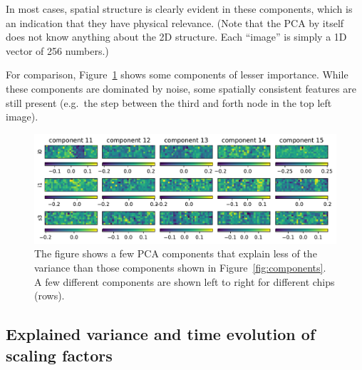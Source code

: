 \documentclass[]{spie}  %
\begin{document}
In most cases, spatial structure is clearly evident in these components, which is an indication that they have physical relevance. (Note that the PCA by itself does not know anything about the 2D structure. Each ``image'' is simply a 1D vector of 256 numbers.)

For comparison, Figure~\ref{fig:components_minor} shows some components of lesser importance. While these components are dominated by noise, some spatially consistent features are still present (e.g.\ the step between the third and forth node in the top left image).

\begin{figure} [ht]
  \begin{center}
    \includegraphics[width=\textwidth]{figures/components_minor.pdf}
  \end{center}
  \caption
      {The figure shows a few PCA components that explain less of the variance than those components shown in Figure~\ref{fig:components}. A few different components are shown left to right for different chips (rows). \label{fig:components_minor}}
\end{figure}

\subsection{Explained variance and time evolution of scaling factors}
\end{document}
